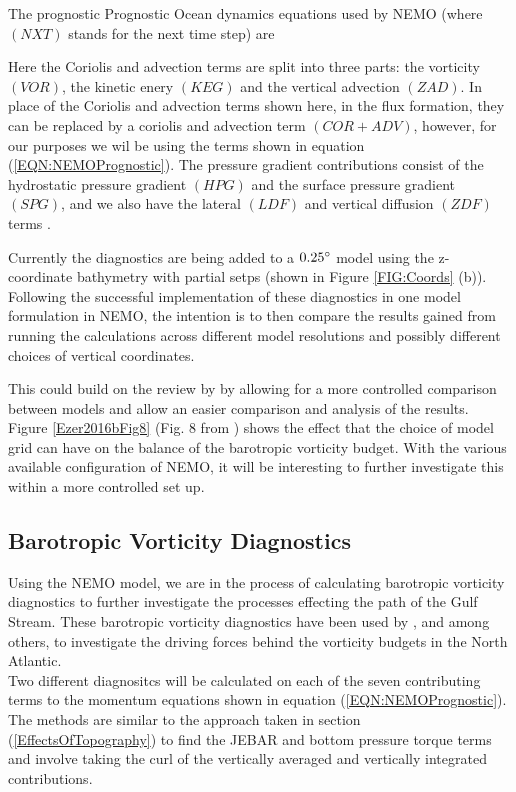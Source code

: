 \documentclass[..\EOYR.tex]{subfiles}
\begin{document}
The prognostic Prognostic Ocean dynamics equations used by NEMO (where $(NXT)$ stands for the next time step) are 


Here the Coriolis and advection terms are split into three parts: the vorticity $(VOR)$, the kinetic enery $(KEG)$ and the vertical advection $(ZAD)$.
In place of the Coriolis and advection terms shown here, in the flux formation, they can be replaced by a coriolis and advection term $(COR + ADV)$, however, for our purposes we wil be using the terms shown in equation (\ref{EQN:NEMOPrognostic}). The pressure gradient contributions consist of the hydrostatic pressure gradient $(HPG)$ and the surface pressure gradient $(SPG)$, and we also have the lateral $(LDF)$ and vertical diffusion $(ZDF)$ terms \citep{Madec2011}.

Currently the diagnostics are being added to a $0.25\degree$ model using the z-coordinate bathymetry with partial setps (shown in Figure \ref{FIG:Coords} (b)).
Following the successful implementation of these diagnostics in one model formulation in NEMO, the intention is to then compare the results gained from running the calculations across different model resolutions and possibly different choices of vertical coordinates.

This could build on the review by \citep{Ezer2016b} by allowing for a more controlled comparison between models and allow an easier comparison and analysis of the results. Figure \ref{Ezer2016bFig8} (Fig. 8 from \citep{Ezer2016b}) shows the effect that the choice of model grid can have on the balance of the barotropic vorticity budget. With the various available configuration of NEMO, it will be interesting to further investigate this within a more controlled set up.


\subsection{Barotropic Vorticity Diagnostics}

Using the NEMO model, we are in the process of calculating barotropic vorticity diagnostics to further investigate the processes effecting the path of the Gulf Stream. These barotropic vorticity diagnostics have been used by \citep{Bell1999}, \citep{Gula2014} and \citep{Yeager2015} among others, to investigate the driving forces behind the vorticity budgets in the North Atlantic.\\

Two different diagnositcs will be calculated on each of the seven contributing terms to the momentum equations shown in equation (\ref{EQN:NEMOPrognostic}). The methods are similar to the approach taken in section (\ref{EffectsOfTopography}) to find the JEBAR and bottom pressure torque terms and involve taking the curl of the vertically averaged and vertically integrated contributions.\\
\end{document}
